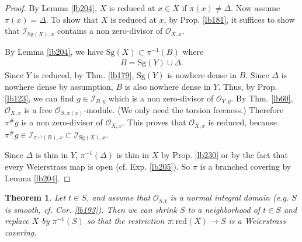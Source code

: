 \documentclass[12pt,b5paper,notitlepage]{report}
\theoremstyle{definition}
\theoremstyle{plain}
\newtheorem{thm}[df]{Theorem}
\newcommand{\scr}{\mathscr}
\newcommand{\red}{\mathrm{red}}
\newcommand{\Sg}{\mathrm{Sg}}
\numberwithin{equation}{section}
\begin{document}
\begin{proof}
By Lemma \ref{lb204}, $X$ is reduced at $x\in X$ if $\pi(x)\neq\Delta$. Now assume $\pi(x)=\Delta$. To show that $X$ is reduced at $x$, by Prop. \ref{lb181}, it suffices to show that $\scr I_{\Sg(X),x}$ contains a non zero-divisor of $\scr O_{X,x}$.

By Lemma \ref{lb204}, we have $\Sg(X)\subset \pi^{-1}(B)$ where
\begin{align*}
B=\Sg(Y)\cup\Delta.
\end{align*}
Since $Y$ is reduced, by Thm. \ref{lb179}, $\Sg(Y)$ is nowhere dense in $B$. Since $\Delta$ is nowhere dense by assumption, $B$ is also nowhere dense in $Y$. Thus, by Prop. \ref{lb123}, we can find $g\in\scr I_{B,y}$ which is a non zero-divisor of $\scr O_{Y,y}$. By Thm. \ref{lb60}, $\scr O_{X,x}$ is a free $\scr O_{S,\pi(x)}$-module. (We only need the torsion freeness.) Therefore $\pi^\# g$ is a non zero-divisor of $\scr O_{X,x}$. This proves that $\scr O_{X,x}$ is reduced, because $\pi^\#g\in\scr I_{\pi^{-1}(B),x}\subset\scr I_{\Sg(X),x}$. 

Since $\Delta$ is thin in $Y$, $\pi^{-1}(\Delta)$ is thin in $X$ by Prop. \ref{lb230} or by the fact that every Weierstrass map is open (cf. Exp. \ref{lb205}). So $\pi$ is a branched covering by Lemma \ref{lb204}.
\end{proof}







\begin{thm}\label{lb210}
Let $t\in S$, and assume that $\scr O_{S,t}$ is a normal integral domain (e.g. $S$ is smooth, cf. Cor. \ref{lb193}). Then we can shrink $S$ to a neighborhood of $t\in S$ and replace $X$ by $\pi^{-1}(S)$ so that the restriction $\pi:\red(X)\rightarrow S$ is a Weierstrass covering.
\end{thm}
\end{document}
